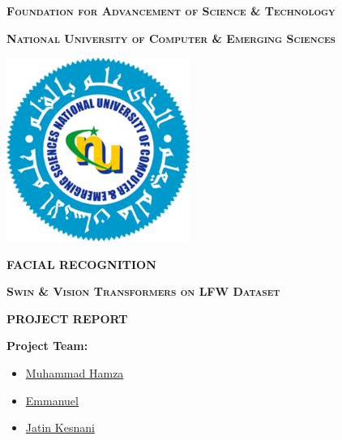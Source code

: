 \documentclass[twocolumn]{IEEEtran}
\begin{document}
\begin{titlepage}
    \centering
    
    {\scshape\LARGE \textbf{Foundation for Advancement of Science \& Technology} \par}

    {\scshape\Huge \textbf{National University of Computer \& Emerging Sciences} \par}
    \vspace{10pt}
    
    \includegraphics[width=0.45\textwidth]{FAST-NUCES-Logo.png}\par
    \vspace{10pt}
    
    {\scshape\Huge \textbf{FACIAL RECOGNITION} \par}
    
    {\scshape\LARGE \textbf{Swin \& Vision Transformers on LFW Dataset} \par}
    \vspace{10pt}
    
    {\scshape\LARGE \textbf{PROJECT REPORT} \par}
    \vspace{10pt}
    
    \begin{flushleft}
        \Large
        \noindent\textbf{Project Team:}
        \vspace{10pt}
        \begin{itemize}
            \item \href{https://github.com/muhammadhamzagova666/}{Muhammad Hamza}
            \vspace{10pt}
            \item \href{https://github.com/emmanuelmoon/}{Emmanuel}
            \vspace{10pt}
            \item \href{https://github.com/Jatin-Kesnani/}{Jatin Kesnani}
        \end{itemize}
        \vspace{10pt}


\end{flushleft}
\end{titlepage}
\end{document}

